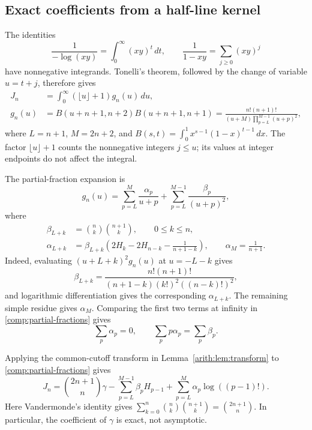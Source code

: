 \documentclass[11pt,a4paper]{article}
\theoremstyle{definition}\newtheorem{definition}[theorem]{Definition}
\theoremstyle{remark}\newtheorem{remark}[theorem]{Remark}
\begin{document}
\subsection{Exact coefficients from a half-line kernel}

The identities
\[
 \frac1{-\log(xy)}=\int_0^\infty(xy)^t\,dt,
 \qquad \frac1{1-xy}=\sum_{j\geq0}(xy)^j
\]
have nonnegative integrands.  Tonelli's theorem, followed by the change
of variable $u=t+j$, therefore gives
\begin{align}
 J_n&=\int_0^\infty(\lfloor u\rfloor+1)g_n(u)\,du,
 \label{comp:half-line}\\
 g_n(u)&=B(u+n+1,n+2)B(u+n+1,n+1)
 =\frac{n!(n+1)!}{(u+M)\prod_{p=L}^{M-1}(u+p)^2},
 \label{comp:kernel}
\end{align}
where $L=n+1$, $M=2n+2$, and
$B(s,t)=\int_0^1x^{s-1}(1-x)^{t-1}\,dx$.
The factor $\lfloor u\rfloor+1$ counts the nonnegative integers $j\leq u$;
its values at integer endpoints do not affect the integral.

The partial-fraction expansion is
\begin{equation}\label{comp:partial-fractions}
 g_n(u)=\sum_{p=L}^{M}\frac{\alpha_p}{u+p}
       +\sum_{p=L}^{M-1}\frac{\beta_p}{(u+p)^2},
\end{equation}
where
\begin{align}
 \beta_{L+k}&=\binom nk\binom{n+1}{k},\qquad 0\leq k\leq n,
 \label{comp:beta}\\
 \alpha_{L+k}&=\beta_{L+k}
 \left(2H_k-2H_{n-k}-\frac1{n+1-k}\right),
 \qquad \alpha_M=\frac1{n+1}.
 \label{comp:alpha}
\end{align}
Indeed, evaluating $(u+L+k)^2g_n(u)$ at $u=-L-k$ gives
\[
 \beta_{L+k}=
 \frac{n!(n+1)!}{(n+1-k)(k!)^2((n-k)!)^2},
\]
and logarithmic differentiation gives the corresponding $\alpha_{L+k}$.
The remaining simple residue gives $\alpha_M$.  Comparing the first two
terms at infinity in \eqref{comp:partial-fractions} gives
\begin{equation}\label{comp:cancellations}
 \sum_p\alpha_p=0,
 \qquad\sum_p p\alpha_p=\sum_p\beta_p.
\end{equation}

Applying the common-cutoff transform in
Lemma~\ref{arith:lem:transform} to \eqref{comp:partial-fractions} gives
\begin{equation}\label{comp:exact-unscaled}
 J_n=\binom{2n+1}{n}\gamma
      -\sum_{p=L}^{M-1}\beta_pH_{p-1}
      +\sum_{p=L}^{M}\alpha_p\log((p-1)!).
\end{equation}
Here Vandermonde's identity gives
$\sum_{k=0}^n\binom nk\binom{n+1}{k}=\binom{2n+1}{n}$.
In particular, the coefficient of $\gamma$ is exact, not asymptotic.
\end{document}
